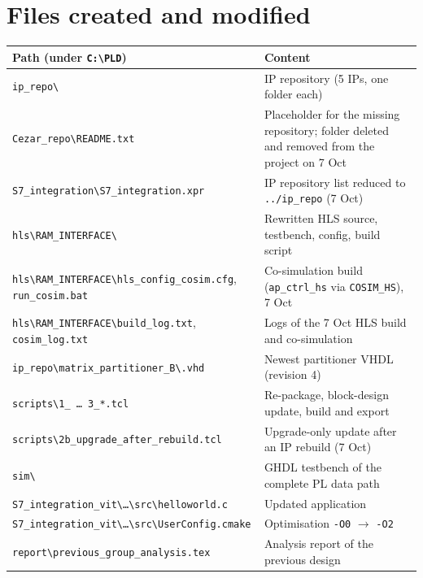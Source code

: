 \documentclass[11pt,a4paper]{article}
\newcommand{\code}[1]{\texttt{#1}}
\begin{document}
\section{Files created and modified}
\begin{longtable}{@{}p{}p{}@{}}
\toprule
\textbf{Path (under \code{C:\textbackslash PLD})} & \textbf{Content} \\
\midrule
\endhead
\code{ip\_repo\textbackslash *} & IP repository (5 IPs, one folder each) \\
\code{Cezar\_repo\textbackslash README.txt} & Placeholder for the missing repository; folder deleted and removed from the project on 7 Oct \\
\code{S7\_integration\textbackslash S7\_integration.xpr} & IP repository list reduced to \code{../ip\_repo} (7 Oct) \\
\code{hls\textbackslash RAM\_INTERFACE\textbackslash *} & Rewritten HLS source, testbench, config, build script \\
\code{hls\textbackslash RAM\_INTERFACE\textbackslash}\allowbreak\code{hls\_config\_cosim.cfg}, \code{run\_cosim.bat} & Co-simulation build (\code{ap\_ctrl\_hs} via \code{COSIM\_HS}), 7 Oct \\
\code{hls\textbackslash RAM\_INTERFACE\textbackslash}\allowbreak\code{build\_log.txt}, \code{cosim\_log.txt} & Logs of the 7 Oct HLS build and co-simulation \\
\code{ip\_repo\textbackslash matrix\_partitioner\_B\textbackslash *.vhd} & Newest partitioner VHDL (revision 4) \\
\code{scripts\textbackslash 1\_ \ldots\ 3\_*.tcl} & Re-package, block-design update, build and export \\
\code{scripts\textbackslash 2b\_upgrade\_after\_rebuild.tcl} & Upgrade-only update after an IP rebuild (7 Oct) \\
\code{sim\textbackslash *} & GHDL testbench of the complete PL data path \\
\code{S7\_integration\_vit\textbackslash}\allowbreak\code{\ldots\textbackslash src\textbackslash helloworld.c} & Updated application \\
\code{S7\_integration\_vit\textbackslash}\allowbreak\code{\ldots\textbackslash src\textbackslash UserConfig.cmake} & Optimisation \code{-O0} $\rightarrow$ \code{-O2} \\
\code{report\textbackslash previous\_group\_analysis.tex} & Analysis report of the previous design \\

\end{longtable}
\end{document}
